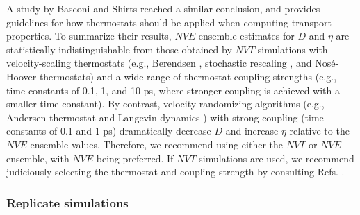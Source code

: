 \documentclass[9pt,bestpractices]{livecoms}
\providecommand{\DIFaddend}{} %
\begin{document}
\DIFaddend A study by Basconi and Shirts \cite{Shirts2013} reached a similar conclusion, and provides guidelines for how thermostats should be applied when computing transport properties. To summarize their results, $NVE$ ensemble estimates for $D$ and $\eta$ are statistically indistinguishable from those obtained by $NVT$ simulations with velocity-scaling thermostats (e.g., Berendsen \cite{Berendsen1984}, stochastic rescaling \cite{Bussi2007}, and Nos{\'e}-Hoover \cite{Nose1984} thermostats) and a wide range of thermostat coupling strengths (e.g., time constants of 0.1, 1, and 10 ps, where stronger coupling is achieved with a smaller time constant). By contrast, velocity-randomizing algorithms (e.g., Andersen thermostat \cite{Andersen1980} and Langevin dynamics \cite{Hess2008}) with strong coupling (time constants of 0.1 and 1 ps) dramatically decrease $D$ and increase $\eta$ relative to the $NVE$ ensemble values. Therefore, we recommend using either the $NVT$ or $NVE$ ensemble, with $NVE$ being preferred. If $NVT$ simulations are used, we recommend judiciously selecting the thermostat and coupling strength by consulting Refs. \cite{Fanourgakis2012,Shirts2013}.




\subsubsection{Replicate simulations} \label{sec:General: Replicate simulations}
\end{document}
